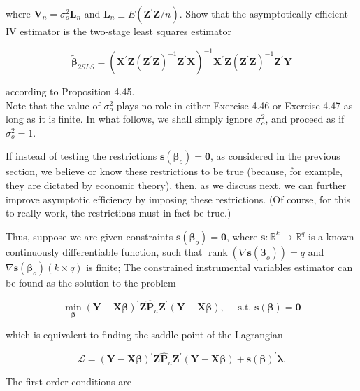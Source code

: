 \documentclass[10pt]{article}
\begin{document}
where $\mathbf{V}_{n}=\sigma_{o}^{2} \mathbf{L}_{n}$ and $\mathbf{L}_{n} \equiv E\left(\mathbf{Z}^{\prime} \mathbf{Z} / n\right)$. Show that the asymptotically efficient IV estimator is the two-stage least squares estimator

$$
\tilde{\boldsymbol{\beta}}_{2 S L S}=\left(\mathbf{X}^{\prime} \mathbf{Z}\left(\mathbf{Z}^{\prime} \mathbf{Z}\right)^{-1} \mathbf{Z}^{\prime} \mathbf{X}\right)^{-1} \mathbf{X}^{\prime} \mathbf{Z}\left(\mathbf{Z}^{\prime} \mathbf{Z}\right)^{-1} \mathbf{Z}^{\prime} \mathbf{Y}
$$

according to Proposition 4.45.\\
Note that the value of $\sigma_{o}^{2}$ plays no role in either Exercise 4.46 or Exercise 4.47 as long as it is finite. In what follows, we shall simply ignore $\sigma_{o}^{2}$, and proceed as if $\sigma_{o}^{2}=1$.

If instead of testing the restrictions $\mathbf{s}\left(\boldsymbol{\beta}_{o}\right)=\mathbf{0}$, as considered in the previous section, we believe or know these restrictions to be true (because, for example, they are dictated by economic theory), then, as we discuss next, we can further improve asymptotic efficiency by imposing these restrictions. (Of course, for this to really work, the restrictions must in fact be true.)

Thus, suppose we are given constraints $\mathbf{s}\left(\boldsymbol{\beta}_{o}\right)=\mathbf{0}$, where $\mathbf{s}: \mathbb{R}^{k} \rightarrow \mathbb{R}^{q}$ is a known continuously differentiable function, such that $\operatorname{rank}\left(\nabla \mathbf{s}\left(\boldsymbol{\beta}_{o}\right)\right)=q$ and $\nabla \mathbf{s}\left(\boldsymbol{\beta}_{o}\right)(k \times q)$ is finite; The constrained instrumental variables estimator can be found as the solution to the problem

$$
\min _{\boldsymbol{\beta}}(\mathbf{Y}-\mathbf{X} \boldsymbol{\beta})^{\prime} \mathbf{Z} \hat{\mathbf{P}}_{n} \mathbf{Z}^{\prime}(\mathbf{Y}-\mathbf{X} \boldsymbol{\beta}), \quad \text { s.t. } \mathbf{s}(\boldsymbol{\beta})=\mathbf{0}
$$

which is equivalent to finding the saddle point of the Lagrangian

$$
\mathcal{L}=(\mathbf{Y}-\mathbf{X} \boldsymbol{\beta})^{\prime} \mathbf{Z} \hat{\mathbf{P}}_{n} \mathbf{Z}^{\prime}(\mathbf{Y}-\mathbf{X} \boldsymbol{\beta})+\mathbf{s}(\boldsymbol{\beta})^{\prime} \boldsymbol{\lambda} .
$$

The first-order conditions are
\end{document}
